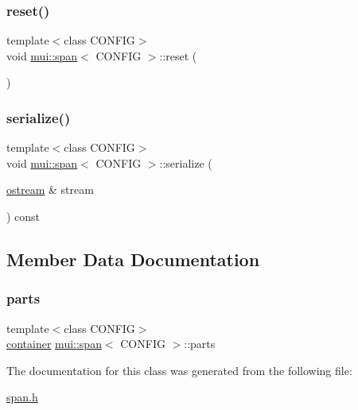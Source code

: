 \mbox{\label{classmui_1_1span_aefd319e26055d859c2c38134adace914}} 
\subsubsection{\texorpdfstring{reset()}{reset()}}
{\footnotesize\ttfamily template$<$class C\+O\+N\+F\+IG$>$ \\
void \hyperlink{classmui_1_1span}{mui\+::span}$<$ C\+O\+N\+F\+IG $>$\+::reset (\begin{DoxyParamCaption}{ }\end{DoxyParamCaption})\hspace{0.3cm}{\ttfamily [inline]}}

\mbox{\label{classmui_1_1span_ad9386445bbcad54a7aefcf1493d98cb1}} 
\subsubsection{\texorpdfstring{serialize()}{serialize()}}
{\footnotesize\ttfamily template$<$class C\+O\+N\+F\+IG$>$ \\
void \hyperlink{classmui_1_1span}{mui\+::span}$<$ C\+O\+N\+F\+IG $>$\+::serialize (\begin{DoxyParamCaption}\item[{\hyperlink{classmui_1_1ostream}{ostream} \&}]{stream }\end{DoxyParamCaption}) const\hspace{0.3cm}{\ttfamily [inline]}}



\subsection{Member Data Documentation}
\mbox{\label{classmui_1_1span_a3ddce7b2d0f2a46b88f8fd4b4eedf3df}} 
\subsubsection{\texorpdfstring{parts}{parts}}
{\footnotesize\ttfamily template$<$class C\+O\+N\+F\+IG$>$ \\
\hyperlink{classmui_1_1span_a255f188b78cfdd6c0be79119c4bcfe82}{container} \hyperlink{classmui_1_1span}{mui\+::span}$<$ C\+O\+N\+F\+IG $>$\+::parts\hspace{0.3cm}{\ttfamily [protected]}}



The documentation for this class was generated from the following file\+:\begin{DoxyCompactItemize}
\item 
\hyperlink{span_8h}{span.\+h}\end{DoxyCompactItemize}
